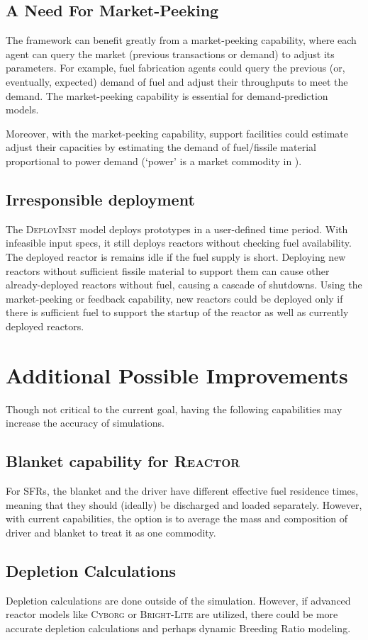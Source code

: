 \subsection{A Need For Market-Peeking}
The \Cyclus framework can benefit greatly from a market-peeking capability,
where each agent can query the market (previous transactions or demand) to adjust its parameters. For example, fuel fabrication
agents could query the previous (or, eventually, expected) demand of fuel and adjust their throughputs to meet the demand. 
The market-peeking capability is essential for demand-prediction models.

Moreover, with the market-peeking capability, support facilities could estimate adjust their
capacities by estimating
the demand of fuel/fissile material proportional to power demand (`power' is a market commodity in \Cyclus).

\subsection{Irresponsible deployment}
The \textsc{DeployInst}\xspace model deploys prototypes in a user-defined time period.
With infeasible input specs, it still deploys reactors without checking fuel availability.
The deployed reactor is remains idle if the fuel supply is short. Deploying new reactors
without sufficient fissile material to support them can cause other already-deployed reactors without fuel, causing
a cascade of shutdowns. Using the market-peeking or feedback capability, new reactors could be deployed only
if there is sufficient fuel to support the startup of the reactor as well as currently deployed reactors. 


\section{Additional Possible Improvements}
Though not critical to the current goal, having the following capabilities may increase
the accuracy of simulations.


\subsection{Blanket capability for \textsc{Reactor}\xspace}
For \glspl{SFR}, the blanket and the driver have different effective fuel residence times, meaning that
they should (ideally) be discharged and loaded separately. However, with current capabilities, the option is to average
the mass and composition of driver and blanket to treat it as one commodity.

\subsection{Depletion Calculations}
Depletion calculations are done outside of the simulation. However, if advanced reactor models like \textsc{Cyborg}\xspace
or \textsc{Bright-Lite}\xspace are utilized, there could be more accurate depletion calculations and 
perhaps dynamic Breeding Ratio modeling.






